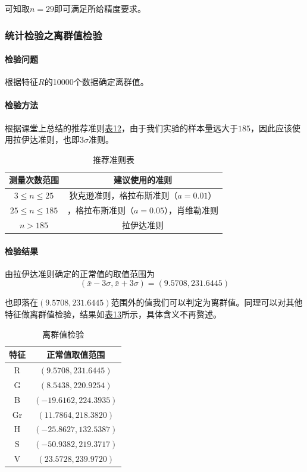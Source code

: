 \documentclass[UTF8]{ctexart}
\begin{document}
	可知取$n=29$即可满足所给精度要求。
	
	
	\subsubsection{统计检验之离群值检验}
	
	\paragraph{检验问题} 根据特征$R$的10000个数据确定离群值。
	
	\paragraph{检验方法} 根据课堂上总结的推荐准则\hyperref[Chart.12]{表12}，由于我们实验的样本量远大于$185$，因此应该使用拉伊达准则，也即$3\sigma$准则。
	
	\begin{table}[htbp]
		\centering
		\caption{推荐准则表}
		\begin{tabular}{cc}
			\toprule
			测量次数范围 & 建议使用的准则 \\
			\midrule
			$3 \leq n \leq 25$ & 狄克逊准则，格拉布斯准则（$a=0.01$） \\
			\midrule
			$25 \leq n \leq 185$ & ，格拉布斯准则（$a=0.05$），肖维勒准则 \\
			\midrule
			$n > 185$ & 拉伊达准则 \\
			\bottomrule
		\end{tabular}%
		\label{Chart.12}%
	\end{table}%
	
	\paragraph{检验结果} 由拉伊达准则确定的正常值的取值范围为
	\begin{equation*}
	(\bar{x} - 3\sigma, \bar{x} + 3\sigma) = (9.5708, 231.6445)
	\end{equation*}
	
	也即落在$(9.5708, 231.6445)$范围外的值我们可以判定为离群值。同理可以对其他特征做离群值检验，结果如\hyperref[Chart.13]{表13}所示，具体含义不再赘述。
	
	\begin{table}[htbp]
		\centering
		\caption{离群值检验}
		\begin{tabular}{cc}
			\toprule
			特征 & 正常值取值范围 \\
			\midrule
			R & $(9.5708, 231.6445)$ \\
			\midrule
			G & $(8.5438, 220.9254)$\\
			\midrule
			B & $(-19.6162, 224.3935)$\\
			\midrule
			Gr & $(11.7864, 218.3820)$\\
			\midrule
			H & $(-25.8627, 132.5387)$\\
			\midrule
			S & $(-50.9382, 219.3717)$\\
			\midrule
			V & $(23.5728, 239.9720)$ \\
			\bottomrule
		\end{tabular}%
		\label{Chart.13}%
	\end{table}%
	
\end{document}
